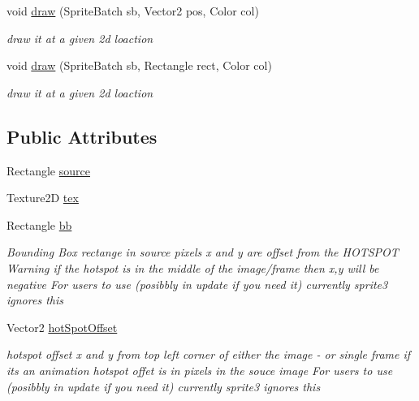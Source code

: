 \begin{DoxyCompactItemize}
void \mbox{\hyperlink{class_r_c___framework_1_1_r_c___frame_a361103a6b92e33f4babc6ec9b02402da}{draw}} (Sprite\+Batch sb, Vector2 pos, Color col)
\begin{DoxyCompactList}\small\item\em draw it at a given 2d loaction \end{DoxyCompactList}\item 
void \mbox{\hyperlink{class_r_c___framework_1_1_r_c___frame_afea32f86d34f1095c53af00e5228622a}{draw}} (Sprite\+Batch sb, Rectangle rect, Color col)
\begin{DoxyCompactList}\small\item\em draw it at a given 2d loaction \end{DoxyCompactList}\end{DoxyCompactItemize}
\subsection*{Public Attributes}
\begin{DoxyCompactItemize}
\item 
Rectangle \mbox{\hyperlink{class_r_c___framework_1_1_r_c___frame_a0e325c29407bc7c18acbbe841095a89a}{source}}
\item 
Texture2D \mbox{\hyperlink{class_r_c___framework_1_1_r_c___frame_a1cf940e9c27e48778d926c5cecea5544}{tex}}
\item 
Rectangle \mbox{\hyperlink{class_r_c___framework_1_1_r_c___frame_a3da33fc90486a672115df3764898b808}{bb}}
\begin{DoxyCompactList}\small\item\em Bounding Box rectange in source pixels x and y are offset from the H\+O\+T\+S\+P\+OT Warning if the hotspot is in the middle of the image/frame then x,y will be negative For users to use (posibbly in update if you need it) currently sprite3 ignores this \end{DoxyCompactList}\item 
Vector2 \mbox{\hyperlink{class_r_c___framework_1_1_r_c___frame_a3188c8af00f675e9419b492d4ef40587}{hot\+Spot\+Offset}}
\begin{DoxyCompactList}\small\item\em hotspot offset x and y from top left corner of either the image -\/ or single frame if its an animation hotspot offet is in pixels in the souce image For users to use (posibbly in update if you need it) currently sprite3 ignores this \end{DoxyCompactList}\end{DoxyCompactItemize}


